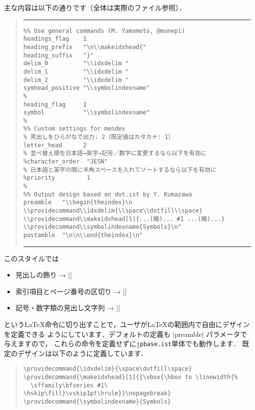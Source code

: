 \documentclass[a4paper,dvipdfmx]{jsarticle}
\newcommand{\FileName}[1]{\texttt{#1}}
\begin{document}
主な内容は以下の通りです（全体は実際のファイル参照）．
\begin{quote}
\hrule\vskip10pt\noautospacing\noautoxspacing
\begin{verbatim}
%% Use general commands (M. Yamamoto, @munepi)
headings_flag    1
heading_prefix   "\n\\makeidxhead{"
heading_suffix   "}"
delim_0          "\\idxdelim "
delim_1          "\\idxdelim "
delim_2          "\\idxdelim "
symhead_positive "\\symbolindexname"
%
heading_flag     1
symbol           "\\symbolindexname"
%
%% Custom settings for mendex
% 見出しをひらがなで出力: 2（既定値はカタカナ: 1）
letter_head      2
% 並べ替え順を日本語→英字→記号／数字に変更するなら以下を有効に
%character_order  "JESN"
% 日本語と英字の間に半角スペースを入れてソートするなら以下を有効に
%priority         1
%
%% Output design based on dot.ist by Y. Kumazawa
preamble   "\\begin{theindex}\n
\\providecommand\\idxdelim{\\space\\dotfill\\space}
\\providecommand\\makeidxhead[1]{...(略)... #1 ...(略)...}
\\providecommand\\symbolindexname{Symbols}\n"
postamble  "\n\n\\end{theindex}\n"
\end{verbatim}
\vskip10pt\hrule
\end{quote}

このスタイルでは
\begin{itemize}
 \item 見出しの飾り → |\makeidxhead|
 \item 索引項目とページ番号の区切り → |\idxdelim|
 \item 記号・数字類の見出し文字列 → |\symbolindexname|
\end{itemize}
という\LaTeX 命令に切り出すことで，ユーザが\LaTeX の範囲内で自由にデザインを定義できる
ようにしています．デフォルトの定義も |preamble| パラメータで与えますので，
これらの命令を定義せずに\FileName{jpbase.ist}単体でも動作します．
既定のデザインは以下のように定義しています．
\begin{quote}
\begin{verbatim}
\providecommand{\idxdelim}{\space\dotfill\space}
\providecommand{\makeidxhead}[1]{{\vbox{\hbox to \linewidth{%
  \sffamily\bfseries #1\ \hskip\fill}\vskip1pt\hrule}}\nopagebreak}
\providecommand{\symbolindexname}{Symbols}
\end{verbatim}
\end{quote}
\end{document}
